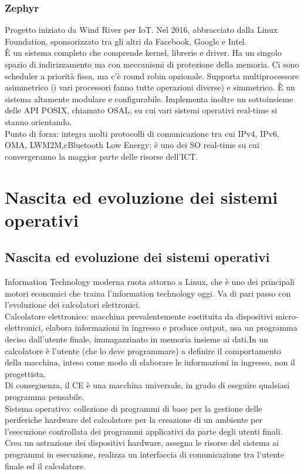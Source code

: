 \documentclass[12pt, oneside]{extbook}
\begin{document}
\subsection{Zephyr}
Progetto iniziato da Wind River per IoT. Nel 2016, abbracciato dalla Linux Foundation, sponsorizzato tra gli altri da Facebook, Google e Intel.\\ È un sistema completo che comprende kernel, librerie e driver. Ha un singolo spazio di indirizzamento ma con meccanismi di protezione della memoria. Ci sono scheduler a priorità fissa, ma c'è round robin opzionale. Supporta multiprocessore asimmetrico (i vari processori fanno tutte operazioni diverse) e simmetrico. È un sistema altamente modulare e configurabile. Implementa inoltre un sottoinsieme delle API POSIX, chiamato OSAL, su cui vari sistemi operativi real-time si stanno orientando.\\ Punto di forza: integra molti protocolli di comunicazione tra cui IPv4, IPv6, OMA, LWM2M,cBluetooth Low Energy; è uno dei SO real-time su cui convergeranno la maggior parte delle risorse dell'ICT.
\chapter{Nascita ed evoluzione dei sistemi operativi}
\section{Nascita ed evoluzione dei sistemi operativi}
Information Technology moderna ruota attorno a Linux, che è uno dei principali motori economici che traina l'information technology oggi. Va di pari passo con l'evoluzione dei calcolatori elettronici.\\ Calcolatore elettronico: macchina prevalentemente costituita da dispositivi micro-elettronici, elabora informazioni in ingresso e produce output, usa un programma deciso dall'utente finale, immagazzinato in memoria insieme ai dati.In un calcolatore è l'utente (che lo deve programmare) a definire il comportamento della macchina, inteso come modo di elaborare le informazioni in ingresso, non il progettista.\\ Di conseguenza, il CE è una macchina universale, in grado di eseguire qualsiasi programma pensabile.\\ Sistema operativo: collezione di programmi di base per la gestione delle periferiche hardware del calcolatore per la creazione di un ambiente per l'esecuzione controllata dei programmi applicativi da parte degli utenti finali.\\ Crea un astrazione dei dispositivi hardware, assegna le risorse del sistema ai programmi in esecuzione, realizza un interfaccia di comunicazione tra l'utente finale ed il calcolatore.
\end{document}
